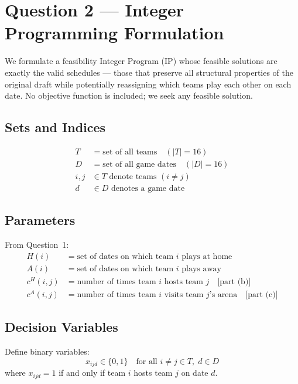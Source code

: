 \documentclass[11pt, letterpaper]{article}
\begin{document}
\section{Question 2 --- Integer Programming Formulation}

We formulate a feasibility Integer Program (IP) whose feasible solutions are
exactly the valid schedules --- those that preserve all structural properties of
the original draft while potentially reassigning which teams play each other on
each date. No objective function is included; we seek any feasible solution.

\subsection{Sets and Indices}

\begin{align*}
  T &= \text{set of all teams} \quad (|T| = 16) \\
  D &= \text{set of all game dates} \quad (|D| = 16) \\
  i, j &\in T \text{ denote teams } (i \neq j) \\
  d &\in D \text{ denotes a game date}
\end{align*}

\subsection{Parameters}

From Question~1:
\begin{align*}
  H(i) &= \text{set of dates on which team } i \text{ plays at home} \\
  A(i) &= \text{set of dates on which team } i \text{ plays away} \\
  c^H(i,j) &= \text{number of times team } i \text{ hosts team } j \quad \text{[part (b)]} \\
  c^A(i,j) &= \text{number of times team } i \text{ visits team } j\text{'s arena} \quad \text{[part (c)]}
\end{align*}

\subsection{Decision Variables}

Define binary variables:
\[
  x_{ijd} \in \{0,1\} \quad \text{for all } i \neq j \in T,\; d \in D
\]
where $x_{ijd} = 1$ if and only if team $i$ hosts team $j$ on date $d$.
\end{document}
